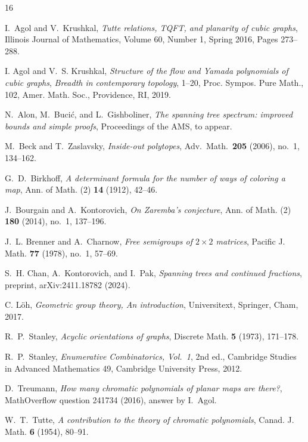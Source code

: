\documentclass[A4paper,reqno,oneside,12pt]{amsart}
\theoremstyle{plain}
\theoremstyle{definition}
\begin{document}
\begin{thebibliography}{16}

I.~Agol and V.~Krushkal,
\emph{Tutte relations, TQFT, and planarity of cubic graphs}, Illinois Journal of Mathematics, Volume 60, Number 1, Spring 2016, Pages 273--288.

I. Agol and V.~S. Krushkal, \emph{Structure of the flow and Yamada polynomials of cubic graphs}, {\it Breadth in contemporary topology}, 1--20, Proc. Sympos. Pure Math., 102, Amer. Math. Soc., Providence, RI, 2019.

N.~Alon, M.~Buci\'c, and L.~Gishboliner,
\emph{The spanning tree spectrum: improved bounds and simple proofs},
Proceedings of the AMS,  to appear. 


 M.~Beck and T.~Zaslavsky, \emph{Inside-out polytopes}, Adv.\ Math.\ \textbf{205} (2006), no.~1, 134--162.
 
G.~D.~Birkhoff,
\emph{A determinant formula for the number of ways of coloring a map},
Ann. of Math. (2) \textbf{14} (1912), 42--46.

J.~Bourgain and A.~Kontorovich,
\emph{On Zaremba's conjecture},
Ann. of Math. (2) \textbf{180} (2014), no.~1, 137--196.

J.~L. Brenner and A.~Charnow,
\emph{Free semigroups of $2 \times 2$ matrices},
Pacific J. Math. \textbf{77} (1978), no.~1, 57--69.

S.~H. Chan, A.~Kontorovich, and I.~Pak,
\emph{Spanning trees and continued fractions},
preprint, arXiv:2411.18782 (2024).

 C. L\"oh, \emph{Geometric group theory, An introduction}, Universitext, Springer, Cham, 2017.

R.~P.~Stanley,
\emph{Acyclic orientations of graphs},
Discrete Math. \textbf{5} (1973), 171--178.


 R.~P.~Stanley, \emph{Enumerative Combinatorics, Vol.~1}, 2nd ed., Cambridge Studies in Advanced Mathematics 49, Cambridge University Press, 2012.


D.~Treumann,
\emph{How many chromatic polynomials of planar maps are there?},
MathOverflow question 241734 (2016),
answer by I.~Agol.

W.~T.~Tutte,
\emph{A contribution to the theory of chromatic polynomials},
Canad. J. Math. \textbf{6} (1954), 80--91.


\end{thebibliography}
\end{document}
